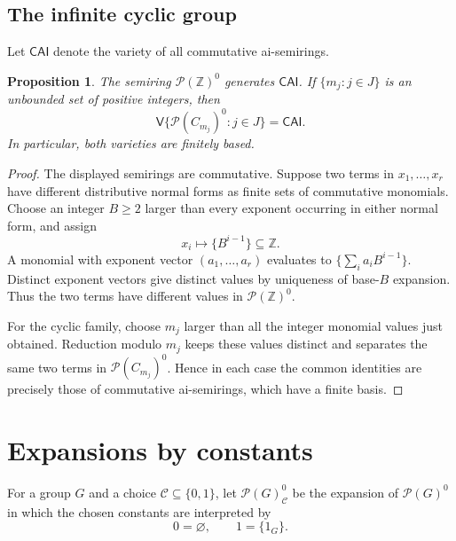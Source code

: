 \documentclass[10pt,a4paper]{amsart}
\newtheorem{proposition}[theorem]{Proposition}
\numberwithin{equation}{section}
\newcommand{\Full}[1]{\mathcal{P}(#1)^0}
\newcommand{\Var}{\mathsf{V}}
\newcommand{\Z}{\mathbb{Z}}
\renewcommand{\geq}{\geqslant}
\begin{document}
\subsection{The infinite cyclic group}
Let $\mathsf{CAI}$ denote the variety of all commutative ai-semirings.

\begin{proposition}\label{prop:infinite}
The semiring $\Full{\Z}$ generates $\mathsf{CAI}$. If $\{m_j:j\in J\}$ is an unbounded set of positive integers, then
\[
 \Var\{\Full{C_{m_j}}:j\in J\}=\mathsf{CAI}.
\]
In particular, both varieties are finitely based.
\end{proposition}
\begin{proof}
The displayed semirings are commutative. Suppose two terms in $x_1,\ldots,x_r$ have different distributive normal forms as finite sets of commutative monomials. Choose an integer $B\geq 2$ larger than every exponent occurring in either normal form, and assign
\[
 x_i\longmapsto\{B^{i-1}\}\subseteq\Z.
\]
A monomial with exponent vector $(a_1,\ldots,a_r)$ evaluates to $\{\sum_i a_iB^{i-1}\}$. Distinct exponent vectors give distinct values by uniqueness of base-$B$ expansion. Thus the two terms have different values in $\Full{\Z}$.

For the cyclic family, choose $m_j$ larger than all the integer monomial values just obtained. Reduction modulo $m_j$ keeps these values distinct and separates the same two terms in $\Full{C_{m_j}}$. Hence in each case the common identities are precisely those of commutative ai-semirings, which have a finite basis.
\end{proof}

\appendix
\section{Expansions by constants}\label{app:constants}
For a group $G$ and a choice $\mathscr C\subseteq\{0,1\}$, let $\Full{G}_{\mathscr C}$ be the expansion of $\Full{G}$ in which the chosen constants are interpreted by
\[
 0=\varnothing,\qquad 1=\{1_G\}.
\]
\end{document}

